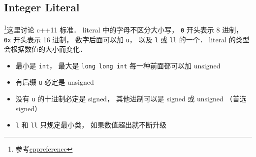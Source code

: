 \subsection{Integer Literal}
\footnote{参考\href{https://en.cppreference.com/w/cpp/language/integer_literal}{cppreference}}这里讨论 c++11 标准． literal 中的字母不区分大小写， \verb|0| 开头表示 8 进制，  \verb|0x| 开头表示 16 进制， 数字后面可以加 \verb|u|， 以及 \verb|l| 或 \verb|ll| 的一个． literal 的类型会根据数值的大小而变化．

\begin{itemize}
\item 最小是 \verb|int|， 最大是 \verb|long long int| 每一种前面都可以加 unsigned
\item 有后缀 \verb|u| 必定是 unsigned
\item 没有 \verb|u| 的十进制必定是 signed， 其他进制可以是 signed 或 unsigned （首选 signed）
\item \verb|l| 和 \verb|ll| 只规定最小类， 如果数值超出就不断升级
\end{itemize}
